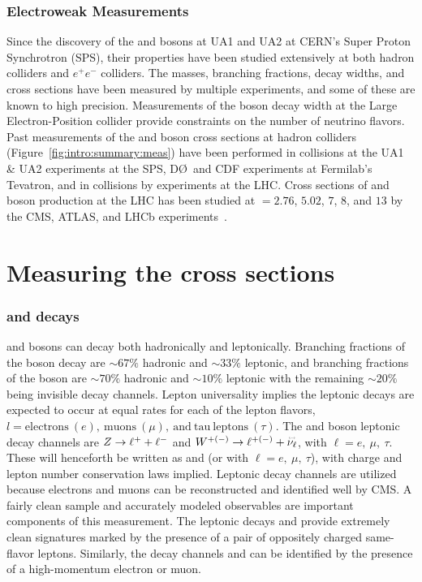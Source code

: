 \subsubsection{Electroweak Measurements}
Since the discovery of the \W and \Z bosons at UA1 and UA2 at CERN's Super Proton Synchrotron (SPS), their properties have been studied extensively at both hadron colliders and $e^+e^-$ colliders. The masses, branching fractions,  decay widths, and cross sections have been measured by multiple experiments, and some of these are known to high precision\cite{PhysRevD.98.030001}. Measurements of the \Z boson decay width at the Large Electron-Position collider provide constraints on the number of neutrino flavors\cite{ALEPH:2005ab}. 
Past measurements of the \W and \Z boson cross sections at hadron colliders (Figure~\ref{fig:intro:summary:meas}) have been performed in \ppbar collisions at the UA1 \& UA2 experiments at the SPS, D\O ~and CDF experiments at Fermilab's Tevatron, and in \pp collisions by experiments at the LHC. 
Cross sections of \Wpm and \Z boson production at the LHC has been studied at \s $= 2.76$, $5.02$, $7$, $8$, and $13$ \TeV by the CMS, ATLAS, and LHCb experiments~\cite{Aad:2019bdc,Aaboud:2018nic,Aaboud:2016btc,CMS:2011aa,Aaij:2014wba,Aaij:2012mda,Aaij:2015gna,Aaij:2016qqz,Aaij:2016mgv,Aaij:2015zlq,Chatrchyan:2014mua,Aad:2016naf}. 




\section{Measuring the cross sections}
\subsubsection{\W and \Z decays}
\W and \Z bosons can decay both hadronically and leptonically. Branching fractions of the \W boson decay are $\sim67\%$ hadronic and $\sim33\%$ leptonic, and branching fractions of the \Z boson are $\sim70\%$ hadronic and $\sim10\%$ leptonic with the remaining $\sim 20\%$ being invisible decay channels\cite{PhysRevD.98.030001}. Lepton universality implies the leptonic decays are expected to occur at equal rates for each of the lepton flavors, $l=\mathrm{electrons}~ (e),~\mathrm{muons}~(\mu),~\mathrm{and~tau~leptons}~ (\tau)$. The \W and \Z boson leptonic decay channels are $Z \to \ell^+ + \ell^-$ and $\W^{+(-)} \to \ell^{+(-)} +  \overset{\textbf{\fontsize{2pt}{2pt}\selectfont(---)}}{\nu_\ell}$, with $\ell=e,~\mu,~\tau$. These will henceforth be written as \zll and \wlnu (or with $\ell=e,~\mu,~\tau$), with charge and lepton number conservation laws implied.
Leptonic decay channels are utilized because electrons and muons can be reconstructed and identified well by CMS. A fairly clean sample and accurately modeled observables are important components of this measurement. The leptonic decays \zee and \zmm provide extremely clean signatures marked by the presence of a pair of oppositely charged same-flavor leptons. Similarly, the decay channels \wenu and \wmunu can be identified by the presence of a high-momentum electron or muon. 
